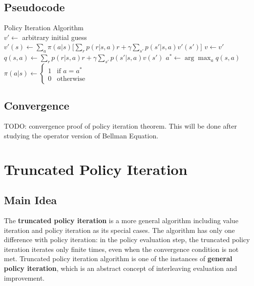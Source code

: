     \subsection{Pseudocode}
        {Policy Iteration Algorithm}
        { \\
         }
        {}
        {
            {
                $v' \leftarrow$ arbitrary initial guess\;
                {
                    {
                        $v'(s) \leftarrow \sum_a\pi(a|s)\Big[ \sum_r p(r|s,a)r + \gamma \sum_{s'}p(s'|s,a)v'(s') \Big]$\;
                    }
                }
                $v \leftarrow v'$\;
                {
                    {
                        $q(s,a) \leftarrow \sum_r p(r|s,a)r + \gamma \sum_{s'}p(s'|s,a)v(s')$\;
                    }
                    $a^* \leftarrow \arg\max_a q(s,a)$\;
                    $\pi(a|s) \leftarrow
                    \begin{cases}
                        1 &\text{if $a=a^*$} \\
                        0 &\text{otherwise}
                    \end{cases}$\;
                }
            }
        }
    \subsection{Convergence}
    TODO: convergence proof of policy iteration theorem. This will be done after studying the operator version of Bellman Equation.
\section{Truncated Policy Iteration}
    \subsection{Main Idea}
        The \textbf{truncated policy iteration} is a more general algorithm including value iteration and policy iteration as its special cases.
        The algorithm has only one difference with policy iteration: in the policy evaluation step, the truncated policy iteration iterates only finite times,
        even when the convergence condition is not met. Truncated policy iteration algorithm is one of the instances of \textbf{general policy iteration}, which is
        an abstract concept of interleaving evaluation and improvement.
        
